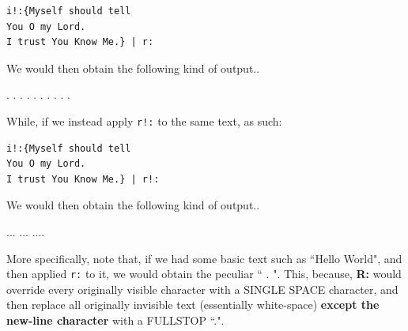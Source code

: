 \documentclass[a4paper, 18pt]{book} %
\begin{document}
{{{\vspace{1em}

  \begin{tcolorbox}[teaterminalstyle, title=R: EXAMPLE 4, breakable]
  \begin{lstlisting}[language=TEA,breaklines=true,]
i!:{Myself should tell 
You O my Lord.
I trust You Know Me.} | r:
   \end{lstlisting}
  \end{tcolorbox}

\vspace{1em}

We would then obtain the following kind of output..


   \begin{tcbverbatim}[title=Sample Text OUTPUT from Example 4]
      .      .    .
   . .  .     
 .     .   .    .   
  \end{tcbverbatim}


\vspace{1em}

While, if we instead apply \texttt{r!:} to the same text, as such:

\vspace{1em}

  \begin{tcolorbox}[teaterminalstyle, title=R: EXAMPLE 5, breakable]
  \begin{lstlisting}[language=TEA,breaklines=true,]
i!:{Myself should tell 
You O my Lord.
I trust You Know Me.} | r!:
   \end{lstlisting}
  \end{tcolorbox}

We would then obtain the following kind of output..


   \begin{tcbverbatim}[title=Sample Text OUTPUT from Example 5]
...
...
....   
  \end{tcbverbatim}


\vspace{1em}


More specifically, note that, if we had some basic text such as ``Hello World", and then applied \texttt{r:} to it, we would obtain the peculiar ``     .     ". This, because, \textbf{R:} would override every originally visible character with a SINGLE SPACE character, and then replace all originally invisible text (essentially white-space) \textbf{except the new-line character} with a FULLSTOP ``.". 

\vspace{2em}

}}}
\end{document}
